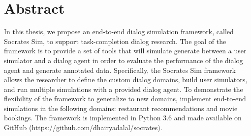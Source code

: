 \chapter*{Abstract}
\thispagestyle{empty}	%

In this thesis, we propose an end-to-end dialog simulation framework, called Socrates Sim, to support task-completion dialog research. The goal of the framework is to provide a set of tools that will simulate generate between a user simulator and a dialog agent in order to evaluate the performance of the dialog agent and generate annotated data. Specifically, the Socrates Sim framework allows the researcher to define the custom dialog domains, build user simulators, and run multiple simulations with a provided dialog agent. To demonstrate the flexibility of the framework to generalize to new domains, implement end-to-end simulations in the following domains: restaurant recommendations and movie bookings. The framework is implemented in Python 3.6 and made available on GitHub (https://github.com/dhairyadalal/socrates). 

